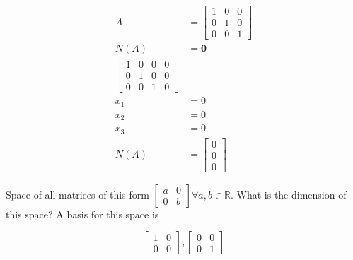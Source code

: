 \documentclass[main.tex]{subfiles}
\begin{document}
$$
\begin{aligned}
A&=\left[\begin{array}{lll}
1 & 0 & 0 \\
0 & 1 & 0 \\
0 & 0 & 1
\end{array}\right]\\
N(A) &= \bm{0}\\
\left[\begin{array}{lll|l}
1 & 0 & 0 & 0 \\
0 & 1 & 0 & 0 \\
0 & 0 & 1 & 0
\end{array}\right]&\\
x_{1}&=0 \\
x_{2}&=0 \\
x_{3}&=0 \\
N(A)&=\left[\begin{array}{l}
0 \\
0 \\
0
\end{array}\right]
\end{aligned}
$$

Space of all matrices of this form $\left[\begin{array}{ll}a & 0 \\ 0 & b\end{array}\right] \forall a, b \in \mathbb{R}$. What is the dimension of this space? A basis for this space is

$$
\left[\begin{array}{ll}
1 & 0 \\
0 & 0
\end{array}\right],\left[\begin{array}{ll}
0 & 0 \\
0 & 1
\end{array}\right]
$$
\end{document}
